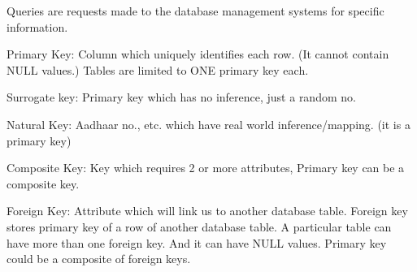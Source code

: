 \documentclass[8pt, a4paper, oneside, twocolumn]{extarticle}
\begin{document}
Queries are requests made to the database management systems for specific information.

Primary Key: Column which uniquely identifies each row. (It cannot contain NULL values.) Tables are limited to ONE primary key each.

Surrogate key: Primary key which has no inference, just a random no.

Natural Key: Aadhaar no., etc. which have real world inference/mapping. (it is a primary key)

Composite Key: Key which requires 2 or more attributes, Primary key can be a composite key. 

Foreign Key: Attribute which will link us to another database table. Foreign key stores primary key of a row of another database table. A particular table can have more than one foreign key. And it can have NULL values. Primary key could be a composite of foreign keys.
\end{document}
